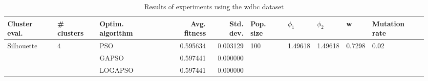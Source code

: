 \begin{table}
\centering
\caption{Results of experiments using the wdbc dataset}
\begin{tabular}{lllrrlllll}
\toprule
              Cluster eval. &        \# clusters & Optim. algorithm &  Avg. fitness &  Std. dev. &            Pop. size &               $\phi_{1}$ &               $\phi_{2}$ &                       w &         Mutation rate \\
\midrule
\multirow{3}{*}{Silhouette} & \multirow{3}{*}{4} &              PSO &      0.595634 &   0.003129 & \multirow{3}{*}{100} & \multirow{3}{*}{1.49618} & \multirow{3}{*}{1.49618} & \multirow{3}{*}{0.7298} & \multirow{3}{*}{0.02} \\
                            &                    &            GAPSO &      0.597441 &   0.000000 &                      &                          &                          &                         &                       \\
                            &                    &          LOGAPSO &      0.597441 &   0.000000 &                      &                          &                          &                         &                       \\
\bottomrule
\end{tabular}
\end{table}
